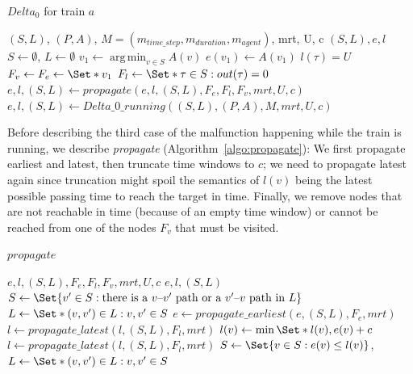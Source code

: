 \documentclass{article}
\DeclareMathOperator*{\argmin}{arg\,min}
\begin{document}
\begin{algorithm}
	\caption{$Delta_0$ for train $a$} \label{algo:Delta0}
	\begin{algorithmic}[1]
		\Require $(S,L)$, $(P,A)$, $M=(m_{time\_step},m_{duration},m_{agent})$, mrt, U, c
	    \Ensure $(S,L),e,l$
            \State $S\leftarrow \emptyset$, $L \leftarrow \emptyset$
            \State $v_1 \leftarrow \argmin_{v\in S} A(v)$
            \State $e(v_1) \leftarrow A(v_1)$
                \State $l(\tau)=U$ 
            \EndFor
            \State $F_v \leftarrow F_e \leftarrow \Set*{v_1}$
            \State $F_l \leftarrow \Set*{\tau \in S: out(\tau)=0}$
            \State $e,l,(S,L) \leftarrow propagate(e,l,(S,L),F_e,F_l,F_v, mrt, U, c)$
        \Else
            \State $e,l,(S,L) \leftarrow Delta\_0\_running((S,L), (P,A), M, mrt, U, c)$
        \EndIf
\end{algorithmic} 
\end{algorithm}


Before describing the third case of the malfunction happening while the train is running, we describe \emph{propagate} (Algorithm~\ref{algo:propagate}): We first propagate earliest and latest, then truncate time windows to $c$; we need to propagate latest again since truncation might spoil the semantics of $l(v)$ being the latest possible passing time to reach the target in time. Finally, we remove nodes that are not reachable in time (because of an empty time window) or cannot be reached from one of the nodes $F_v$ that must be visited.

\begin{algorithm}
	\caption{$propagate$} \label{algo:propagate}
	\begin{algorithmic}[1]
	    \Require $e,l,(S,L),F_e,F_l,F_v,mrt,U,c$ 
	    \Ensure $e,l,(S,L)$
		    \State $S \leftarrow \Set{v^\prime \in S: \textrm{there is a }v\textrm{--}v^\prime\textrm{ path or a }v^\prime\textrm{--}v\textrm{ path in }L}$
		    \State $L \leftarrow \Set*{(v,v^\prime) \in L: v,v^\prime \in S}$
		\EndFor
	    \State $e \leftarrow propagate\_earliest(e, (S,L), F_e, mrt)$
		\State $l \leftarrow propagate\_latest(l,(S,L),F_l, mrt)$
	        \State $l(v) \leftarrow \min \Set*{l(v), e(v)+c}$
	    \EndFor
	    \State $l \leftarrow propagate\_latest(l,(S,L),F_l, mrt)$
	    \EndIf
		\State $S \leftarrow \Set{v \in S: e(v) \leq l(v)}$, $L \leftarrow \Set*{(v,v^\prime) \in L: v,v^\prime \in S}$

	\end{algorithmic} 
\end{algorithm}
\end{document}
